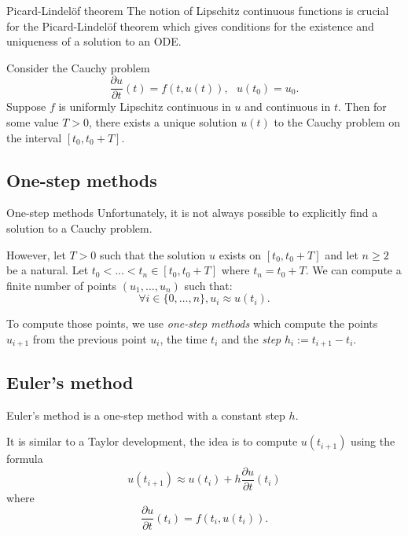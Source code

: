 \documentclass[11pt]{beamer}
\begin{document}
\begin{frame}{Picard-Lindelöf theorem}
The notion of Lipschitz continuous functions is crucial for the Picard-Lindelöf theorem which gives conditions for the existence and uniqueness of a solution to an ODE.
\begin{theorem}

Consider the Cauchy problem
$$
\frac{\partial u}{\partial t} (t) = f(t, u(t)), \ \ \ u(t_0) = u_0.
$$
Suppose $f$ is uniformly Lipschitz continuous in $u$ and continuous in $t$. Then for some value $T > 0$, there exists a unique solution $u(t)$ to the Cauchy problem on the interval $[t_0, t_0 + T]$. 
\end{theorem}
\end{frame}

\subsection{One-step methods}
\begin{frame}{One-step methods}
Unfortunately, it is not always possible to explicitly find a solution to a Cauchy problem. 

However, let $T > 0$ such that the solution $u$ exists on $[t_0, t_0 + T]$ and let $n \geqslant 2$ be a natural. Let  $t_0 < ... < t_n \in [t_0, t_0 + T]$ where $t_n = t_0 + T$. We can compute a finite number of points $(u_1, \dots, u_n)$ such that:
$$
\forall i\in \{0,\dots, n\},  u_i \approx u(t_i).
$$

To compute those points, we use \textit{one-step methods} which compute the points $u_{i+1}$ from the previous point $u_i$, the time $t_i$ and the \textit{step} $h_i := t_{i+1} - t_i$.
\end{frame}

\subsection{Euler's method} \label{euler}
\begin{frame}
Euler's method is a one-step method with a constant step $h$. 

It is similar to a Taylor development, the idea is to compute $u(t_{i+1})$ using the formula
\begin{equation}\label{eqeuler}
u(t_{i+1}) \approx u(t_i) + h\frac{\partial u}{\partial t}(t_i)
\end{equation}
where 
$$
\frac{\partial u}{\partial t}(t_i) = f(t_i, u(t_i)).
$$
\end{frame}
\end{document}
